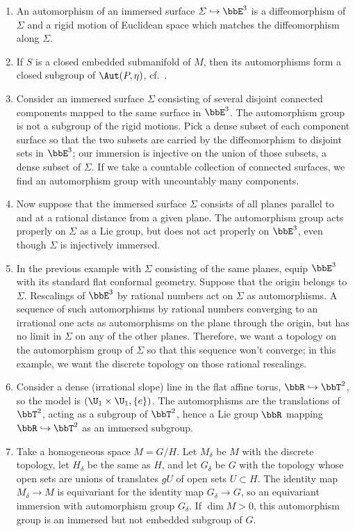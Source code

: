 \begin{example}
    \begin{enumerate}
        \item An automorphism of an immersed surface $\varSigma\hookrightarrow\bbE^3$ is a diffeomorphism of $\varSigma$ and a rigid motion of Euclidean space which matches the diffeomorphism along $\varSigma$.
        \item If $S$ is a closed embedded submanifold of $M$, then its automorphisms form a closed subgroup of $\Aut(P,\eta)$, cf.\ \cite[p.~44]{Mimura}.
        \item  Consider an immersed surface $\varSigma$ consisting of several disjoint connected components mapped to the same surface in $\bbE^3$. The automorphism group is not a subgroup of the rigid motions. Pick a dense subset of each component surface so that the two subsets are carried by the diffeomorphism to disjoint sets in $\bbE^3$; our immersion is injective on the union of those subsets, a dense subset of $\varSigma$. If we take a countable collection of connected surfaces, we find an automorphism group with uncountably many components.
        \item Now suppose that the immersed surface $\varSigma$ consists of all planes parallel to and at a rational distance from a given plane. The automorphism group acts properly on $\varSigma$ as a Lie group, but does not act properly on $\bbE^3$, even though $\varSigma$ is injectively immersed.
        \item  In the previous example with $\varSigma$ consisting of the same planes, equip $\bbE^3$ with its standard flat conformal geometry. Suppose that the origin belongs to $\varSigma$. Rescalings of $\bbE^3$ by rational numbers act on $\varSigma$ as automorphisms. A sequence of such automorphisms by rational numbers converging to an irrational one acts as automorphisms on the plane through the origin, but has no limit in $\varSigma$ on any of the other planes. Therefore, we want a topology on the automorphism group of $\varSigma$ so that this sequence won't converge; in this example, we want the discrete topology on those rational rescalings.
        \item Consider a dense (irrational slope) line in the flat affine torus, $\bbR\hookrightarrow\bbT^2$, so the model is $(\U_1\times\U_1,\{e\})$. The automorphisms are the translations of $\bbT^2$, acting as a subgroup of $\bbT^2$, hence a Lie group $\bbR$ mapping $\bbR\hookrightarrow \bbT^2$ as an immersed subgroup. 
        \item Take a homogeneous space $M=G\slash H$. Let $M_\delta$ be $M$ with the discrete topology, let $H_\delta$ be the same as $H$, and let $G_\delta$ be $G$ with the topology whose open sets are unions of translates $gU$ of open sets $U\subset H$. The identity map $M_\delta\to M$ is equivariant for the identity map $G_\delta\to G$, so an equivariant immersion with automorphism group $G_\delta$. If $\dim M>0$, this automorphism group is an immersed but not embedded subgroup of $G$.

\end{enumerate}
\end{example}
